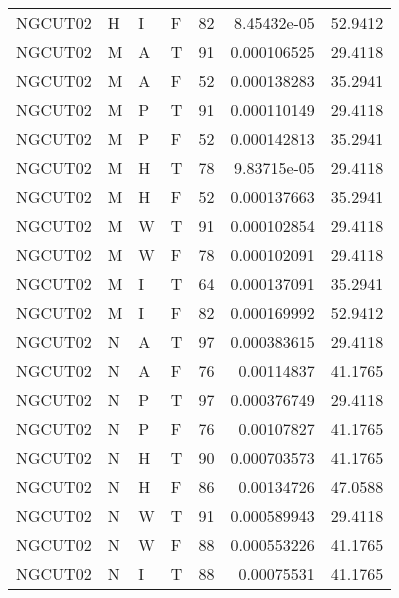 \begin{longtable}{llllrrr}
    NGCUT02  & H         & I         & F          & 82         & 8.45432e-05 & 52.9412  \\
    NGCUT02  & M         & A         & T          & 91         & 0.000106525 & 29.4118  \\
    NGCUT02  & M         & A         & F          & 52         & 0.000138283 & 35.2941  \\
    NGCUT02  & M         & P         & T          & 91         & 0.000110149 & 29.4118  \\
    NGCUT02  & M         & P         & F          & 52         & 0.000142813 & 35.2941  \\
    NGCUT02  & M         & H         & T          & 78         & 9.83715e-05 & 29.4118  \\
    NGCUT02  & M         & H         & F          & 52         & 0.000137663 & 35.2941  \\
    NGCUT02  & M         & W         & T          & 91         & 0.000102854 & 29.4118  \\
    NGCUT02  & M         & W         & F          & 78         & 0.000102091 & 29.4118  \\
    NGCUT02  & M         & I         & T          & 64         & 0.000137091 & 35.2941  \\
    NGCUT02  & M         & I         & F          & 82         & 0.000169992 & 52.9412  \\
    NGCUT02  & N         & A         & T          & 97         & 0.000383615 & 29.4118  \\
    NGCUT02  & N         & A         & F          & 76         & 0.00114837  & 41.1765  \\
    NGCUT02  & N         & P         & T          & 97         & 0.000376749 & 29.4118  \\
    NGCUT02  & N         & P         & F          & 76         & 0.00107827  & 41.1765  \\
    NGCUT02  & N         & H         & T          & 90         & 0.000703573 & 41.1765  \\
    NGCUT02  & N         & H         & F          & 86         & 0.00134726  & 47.0588  \\
    NGCUT02  & N         & W         & T          & 91         & 0.000589943 & 29.4118  \\
    NGCUT02  & N         & W         & F          & 88         & 0.000553226 & 41.1765  \\
    NGCUT02  & N         & I         & T          & 88         & 0.00075531  & 41.1765  \\

\end{longtable}
